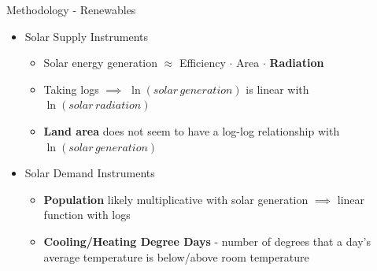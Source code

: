 \documentclass[11pt,aspectratio=169]{beamer}
\begin{document}
\begin{frame}{Methodology - Renewables}

\begin{itemize}
	\setlength\itemsep{1.5em}
	
	\item Solar Supply Instruments
	
	\begin{itemize}
		\item Solar energy generation $\approx$ Efficiency $\cdot$ Area $\cdot$ \textbf{Radiation}
		\item Taking logs $\implies$ $\ln(solar\,generation)$ is linear with $\ln(solar\,radiation)$ 
		\item \textbf{Land area} does not seem to have a log-log relationship with $\ln(solar\,generation)$
	\end{itemize}

	\item Solar Demand Instruments

	\begin{itemize}
		\item \textbf{Population} likely multiplicative with solar generation $\implies$ linear function with logs
		\item \textbf{Cooling/Heating Degree Days} - number of degrees that a day's average temperature is below/above room temperature
	\end{itemize}
	
\end{itemize}

\end{frame}
\end{document}
